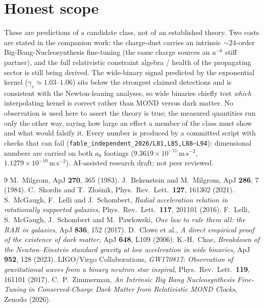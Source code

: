 \documentclass[11pt,letterpaper]{article}
\newcommand{\ms}{\,\mathrm{m\,s^{-2}}}
\begin{document}
\section{Honest scope}
These are predictions of a candidate class, not of an established theory. Two costs are stated in the
companion work: the charge-dust carries an intrinsic $\sim\!24$-order Big-Bang-Nucleosynthesis fine-tuning
(the same charge sources an $a^{-6}$ stiff partner), and the full relativistic constraint algebra / health of
the propagating sector is still being derived. The wide-binary signal predicted by the exponential kernel
($\gamma_v\simeq1.03$--$1.06$) sits below the strongest claimed detections and is consistent with the
Newton-leaning analyses, so wide binaries chiefly test \emph{which} interpolating kernel is correct rather
than MOND versus dark matter. No observation is used here to assert the theory is true; the measured
quantities run only the other way, saying how large an effect a member of the class must show and what would
falsify it. Every number is produced by a committed script with checks that can fail
(\texttt{fable\_independent\_2026/L81,L85,L88--L94}); dimensional numbers are carried on both $a_0$ footings
($9.3619\times10^{-11}\ms$, $1.1279\times10^{-10}\ms$). AI-assisted research draft; not peer reviewed.

\begin{thebibliography}{9}
 M.~Milgrom, ApJ \textbf{270}, 365 (1983).
 J.~Bekenstein and M.~Milgrom, ApJ \textbf{286}, 7 (1984).
 C.~Skordis and T.~Z\l{}o\'snik, Phys.\ Rev.\ Lett.\ \textbf{127}, 161302 (2021).
 S.~McGaugh, F.~Lelli and J.~Schombert, \emph{Radial acceleration relation in rotationally supported galaxies}, Phys.\ Rev.\ Lett.\ \textbf{117}, 201101 (2016).
 F.~Lelli, S.~McGaugh, J.~Schombert and M.~Pawlowski, \emph{One law to rule them all: the RAR in galaxies}, ApJ \textbf{836}, 152 (2017).
 D.~Clowe et al., \emph{A direct empirical proof of the existence of dark matter}, ApJ \textbf{648}, L109 (2006).
 K.-H.~Chae, \emph{Breakdown of the Newton--Einstein standard gravity at low acceleration in wide binaries}, ApJ \textbf{952}, 128 (2023).
 LIGO/Virgo Collaborations, \emph{GW170817: Observation of gravitational waves from a binary neutron star inspiral}, Phys.\ Rev.\ Lett.\ \textbf{119}, 161101 (2017).
 C.~P.~Zimmerman, \emph{An Intrinsic Big Bang Nucleosynthesis Fine-Tuning in Conserved-Charge Dark Matter from Relativistic MOND Clocks}, Zenodo (2026).
\end{thebibliography}
\end{document}
